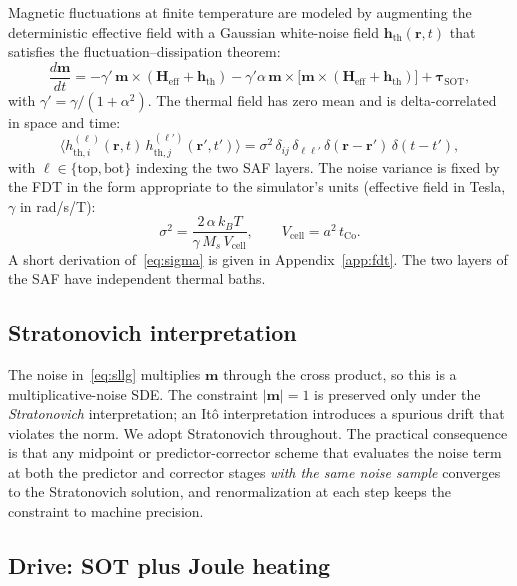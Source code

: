 \documentclass[11pt,a4paper]{article}
\newcommand{\mb}[1]{\mathbf{#1}}
\newcommand{\Heff}{\mb{H}_{\text{eff}}}
\newcommand{\hth}{\mb{h}_{\text{th}}}
\newcommand{\Ms}{M_s}
\newcommand{\Vcell}{V_{\text{cell}}}
\newcommand{\tCo}{t_{\text{Co}}}
\newcommand{\kB}{k_B}
\begin{document}
Magnetic fluctuations at finite temperature are modeled by augmenting
the deterministic effective field with a Gaussian white-noise field
$\hth(\mb{r}, t)$ that satisfies the fluctuation--dissipation theorem:
%
\begin{equation}\label{eq:sllg}
\frac{d\mb{m}}{dt} = -\gamma' \, \mb{m} \times (\Heff + \hth)
- \gamma' \alpha \, \mb{m} \times \big[\mb{m} \times (\Heff + \hth)\big]
+ \bm{\tau}_{\text{SOT}},
\end{equation}
%
with $\gamma' = \gamma / (1 + \alpha^2)$. The thermal field has zero
mean and is delta-correlated in space and time:
%
\begin{equation}\label{eq:fdt}
\langle h_{\text{th},i}^{(\ell)}(\mb{r}, t)\, h_{\text{th},j}^{(\ell')}(\mb{r}', t') \rangle
= \sigma^2 \, \delta_{ij}\, \delta_{\ell\ell'}\,
\delta(\mb{r} - \mb{r}')\, \delta(t - t'),
\end{equation}
%
with $\ell \in \{\text{top}, \text{bot}\}$ indexing the two SAF
layers. The noise variance is fixed by the FDT in the form
appropriate to the simulator's units (effective field in Tesla,
$\gamma$ in rad/s/T):
%
\begin{equation}\label{eq:sigma}
\boxed{\;
\sigma^2 = \frac{2\, \alpha\, \kB T}{\gamma\, \Ms\, \Vcell},
\qquad
\Vcell = a^2 \, \tCo.
\;}
\end{equation}
%
A short derivation of~\eqref{eq:sigma} is given in
Appendix~\ref{app:fdt}. The two layers of the SAF have independent
thermal baths.

\subsection{Stratonovich interpretation}

The noise in~\eqref{eq:sllg} multiplies $\mb{m}$ through the cross
product, so this is a multiplicative-noise SDE. The constraint
$|\mb{m}|=1$ is preserved only under the \emph{Stratonovich}
interpretation; an It\^{o} interpretation introduces a spurious drift
that violates the norm. We adopt Stratonovich throughout. The
practical consequence is that any midpoint or predictor-corrector
scheme that evaluates the noise term at both the predictor and
corrector stages \emph{with the same noise sample} converges to the
Stratonovich solution, and renormalization at each step keeps the
constraint to machine precision.

\subsection{Drive: SOT plus Joule heating}
\end{document}
